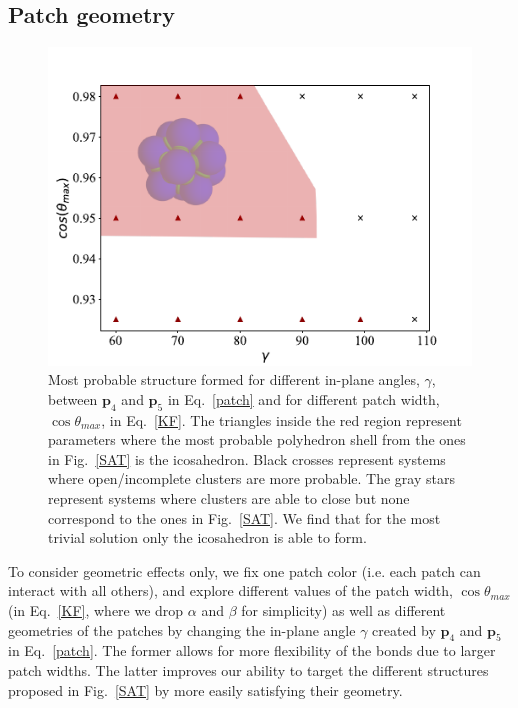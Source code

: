 \documentclass[a4paper, amsfonts, amssymb, amsmath, reprint, showkeys, nofootinbib, twoside]{revtex4-1}
\begin{document}
\subsection{Patch geometry}


\begin{figure}[t]
	\includegraphics{fig2.pdf}
	\caption{\label{N1c1} Most probable structure formed for different in-plane angles, $\gamma$, between $\textbf{p}_4$ and $\textbf{p}_5$ in Eq.~\ref{patch} and for different patch width, $\cos\theta_{max}$, in Eq.~\ref{KF}. The triangles inside the red region represent parameters where the most probable polyhedron shell from the ones in Fig.~\ref{SAT} is the icosahedron. Black crosses represent systems where open/incomplete clusters are more probable. The gray stars represent systems where clusters are able to close but none correspond to the ones in Fig.~\ref{SAT}. We find that for the most trivial solution only the icosahedron is able to form.}
\end{figure}


To consider geometric effects only, we fix one patch color (i.e. each patch can interact with all others), and explore different values of the patch width, $\cos\theta_{max}$ (in Eq.~\ref{KF}, where we drop $\alpha$ and $\beta$ for simplicity) as well as different geometries of the patches by changing the in-plane angle $\gamma$ created by $\textbf{p}_4$ and $\textbf{p}_5$ in Eq.~\ref{patch}. The former allows for more flexibility of the bonds due to larger patch widths. The latter improves our ability to target the different structures proposed in Fig.~\ref{SAT} by more easily satisfying their geometry.
\end{document}
